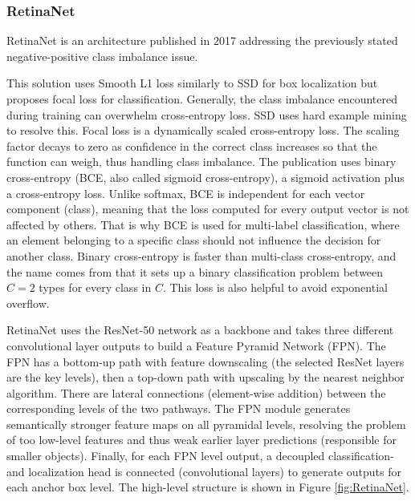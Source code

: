 \subsubsection{RetinaNet}

RetinaNet\cite{RetinaNet} is an architecture published in 2017 addressing the previously stated negative-positive class imbalance issue. 

This solution uses Smooth L1 loss similarly to SSD for box localization but proposes focal loss for classification. Generally, the class imbalance encountered during training can overwhelm cross-entropy loss. SSD uses hard example mining to resolve this. Focal loss is a dynamically scaled cross-entropy loss. The scaling factor decays to zero as confidence in the correct class increases so that the function can weigh, thus handling class imbalance. The publication uses binary cross-entropy (BCE, also called sigmoid cross-entropy), a sigmoid activation plus a cross-entropy loss. Unlike softmax, BCE is independent for each vector component (class), meaning that the loss computed for every output vector is not affected by others. That is why BCE is used for multi-label classification, where an element belonging to a specific class should not influence the decision for another class. Binary cross-entropy is faster than multi-class cross-entropy, and the name comes from that it sets up a binary classification problem between \(C=2\) types for every class in \(C\). This loss is also helpful to avoid exponential overflow. 

RetinaNet uses the ResNet-50 network as a backbone and takes three different convolutional layer outputs to build a Feature Pyramid Network (FPN). The FPN has a bottom-up path with feature downscaling (the selected ResNet layers are the key levels), then a top-down path with upscaling by the nearest neighbor algorithm. There are lateral connections (element-wise addition) between the corresponding levels of the two pathways. The FPN module generates semantically stronger feature maps on all pyramidal levels, resolving the problem of too low-level features and thus weak earlier layer predictions (responsible for smaller objects). Finally, for each FPN level output, a decoupled classification- and localization head is connected (convolutional layers) to generate outputs for each anchor box level. The high-level structure is shown in Figure \ref{fig:RetinaNet}.

